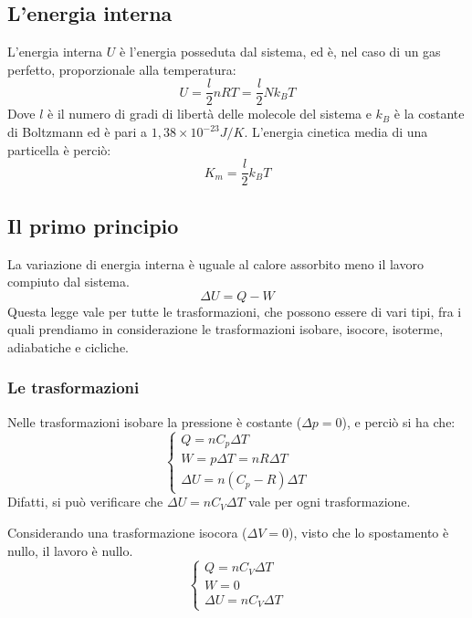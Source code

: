 \documentclass{article}
\begin{document}
\subsection{L'energia interna}
L'energia interna $U$ è l'energia posseduta dal sistema, ed è, nel  caso di un gas perfetto, proporzionale alla temperatura:
\begin{equation}
    U=\frac{l}{2}nRT=\frac{l}{2}Nk_BT
\end{equation}
Dove $l$ è il numero di gradi di libertà delle molecole del sistema e $k_B$ è la costante di Boltzmann ed è pari a $1,38 \times 10^{-23} J/K$.
L'energia cinetica media di una particella è perciò:
\begin{equation}
    K_m=\frac{l}{2}k_BT
\end{equation}


\subsection{Il primo principio}
La variazione di energia interna è uguale al calore assorbito meno il lavoro compiuto dal sistema.
\begin{equation}
    \Delta U = Q - W
\end{equation}
Questa legge vale per tutte le trasformazioni, che possono essere di vari tipi, fra i quali prendiamo in considerazione le trasformazioni isobare, isocore, isoterme, adiabatiche e cicliche.

\subsubsection{Le trasformazioni}
Nelle trasformazioni isobare la pressione è costante ($\Delta p=0$), e perciò si ha che:
\begin{equation}
    \begin{cases}
        Q=nC_p\Delta T\\
        W=p\Delta T=nR\Delta T\\
        \Delta U=n(C_p-R)\Delta T
    \end{cases}
\end{equation}
Difatti, si può verificare che $\Delta U=nC_V\Delta T$ vale per ogni trasformazione.
\vspace{3mm}

Considerando una trasformazione isocora ($\Delta V=0$), visto che lo spostamento è nullo, il lavoro è nullo.
\begin{equation}
    \begin{cases}
        Q=nC_V\Delta T\\
        W=0\\
        \Delta U=nC_V\Delta T
    \end{cases}
\end{equation}
\vspace{3mm}
\end{document}
